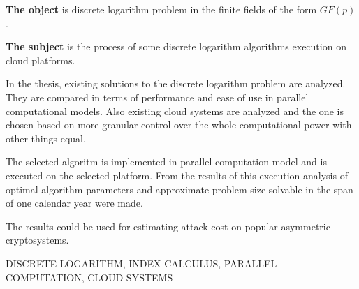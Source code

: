 \textbf{The object} is discrete logarithm problem in the finite fields of the form $GF(p)$.

\textbf{The subject} is the process of some discrete logarithm algorithms execution on cloud platforms.


In the thesis, existing solutions to the discrete logarithm problem are analyzed. They are compared in terms of performance and ease of use in parallel computational models. Also existing cloud systems are analyzed and the one is chosen based on more granular control over the whole computational power with other things equal.

The selected algoritm is implemented in parallel computation model and is executed on the selected  platform. From the results of this execution analysis of optimal algorithm parameters and approximate problem size solvable in the span of one calendar year were made.



The results could be used for estimating attack cost on popular asymmetric cryptosystems.

\MakeUppercase{discrete logarithm, index-calculus, parallel computation, cloud systems}